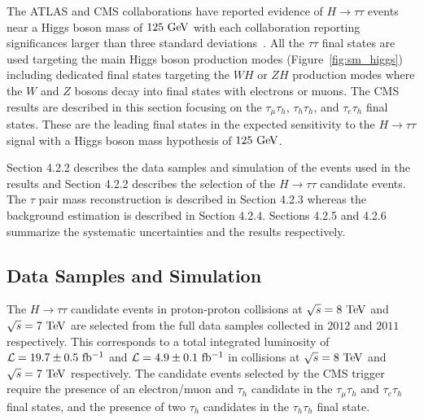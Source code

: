 The ATLAS and CMS collaborations have reported evidence of $H\rightarrow\tau\tau$ events near a Higgs boson mass of $125~\mathrm{Ge\kern -0.1em V}$ with each collaboration reporting significances larger than three standard deviations~\cite{Aad:2015vsa,Chatrchyan:2014nva}. All the $\tau\tau$ final states are used targeting the main Higgs boson production modes (Figure~\ref{fig:sm_higgs}) including dedicated final states targeting the $WH$ or $ZH$ production modes where the $W$ and $Z$ bosons decay into final states with electrons or muons. The CMS results are described in this section focusing on the $\tau_{\mu}\tau_{h}$, $\tau_{h}\tau_{h}$, and $\tau_{e}\tau_{h}$ final states. These are the leading final states in the expected sensitivity to the $H \rightarrow \tau\tau$ signal with a Higgs boson mass hypothesis of $125~\mathrm{Ge\kern -0.1em V}$. 

Section 4.2.2 describes the data samples and simulation of the events used in the results and Section 4.2.2 describes the selection of the $H\rightarrow\tau\tau$ candidate events. The $\tau$ pair mass reconstruction is described in Section 4.2.3 whereas the background estimation is described in Section 4.2.4. Sections 4.2.5 and 4.2.6 summarize the systematic uncertainties and the results respectively.

\subsection{Data Samples and Simulation}

The $H \rightarrow \tau\tau$ candidate events in proton-proton collisions at $\sqrt{s}=8~\mathrm{Te\kern -0.1em V}$ and $\sqrt{s}=7~\mathrm{Te\kern -0.1em V}$ are selected from the full data samples collected in $2012$ and $2011$ respectively. This corresponds to a total integrated luminosity of $\mathcal{L}=19.7\pm0.5~\mathrm{fb^{-1}}$ and  $\mathcal{L}=4.9\pm0.1~\mathrm{fb^{-1}}$ in collisions at $\sqrt{s}=8~\mathrm{Te\kern -0.1em V}$ and $\sqrt{s}=7~\mathrm{Te\kern -0.1em V}$ respectively. The candidate events selected by the CMS trigger require the presence of an electron/muon and $\tau_h$ candidate in the $\tau_{\mu}\tau_{h}$ and $\tau_{e}\tau_{h}$ final states, and the presence of two $\tau_h$ candidates in the  $\tau_{h}\tau_{h}$ final state.

